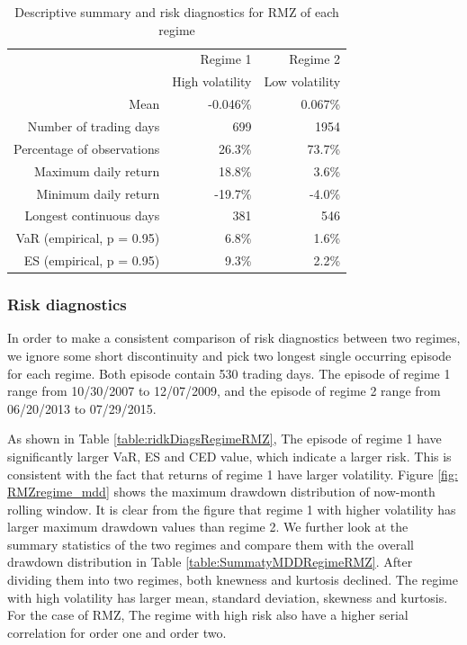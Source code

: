 \documentclass[12pt]{article}
\begin{document}
\begin{table}[h]
\caption{Descriptive summary and risk diagnostics for RMZ of each regime} 
\centering 
\begin{tabular}{| r | r | r |} 
 \hline
& Regime 1 & Regime 2 \\
& High volatility & Low volatility \\
 \hline 
Mean & -0.046\% & 0.067\% \\
Number of trading days & 699 & 1954\\ 
Percentage of observations & 26.3\% & 73.7\% \\ 
Maximum daily return &18.8\% & 3.6\% \\
Minimum daily return & -19.7\% & -4.0\% \\
Longest continuous days & 381 & 546\\ \hline
VaR (empirical, p = 0.95) & 6.8\% & 1.6\% \\
ES (empirical, p = 0.95) & 9.3\% & 2.2\% \\
 \hline
\end{tabular}
\label{table:statSumRegimeRMZ}
\end{table}

\subsubsection{Risk diagnostics}

In order to make a consistent comparison of risk diagnostics between two regimes, we ignore some short discontinuity and pick two longest single occurring episode for each regime. Both episode contain 530 trading days. The episode of regime 1 range from 10/30/2007 to 12/07/2009, and the episode of regime 2 range from 06/20/2013 to 07/29/2015.

As shown in Table \ref{table:ridkDiagsRegimeRMZ}, The episode of regime 1 have significantly larger VaR, ES and CED value, which indicate a larger risk. This is consistent with the fact that returns of regime 1 have larger volatility. Figure \ref{fig: RMZregime_mdd} shows the maximum drawdown distribution of now-month rolling window. It is clear from the figure that regime 1 with higher volatility has larger maximum drawdown values than regime 2. We further look at the summary statistics of the two regimes and compare them with the overall drawdown distribution in Table \ref{table:SummatyMDDRegimeRMZ}. After dividing them into two regimes, both knewness and kurtosis declined. The regime with high volatility has larger mean, standard deviation, skewness and kurtosis. For the case of RMZ, The regime with high risk also have a higher serial correlation for order one and order two. 
\end{document}
